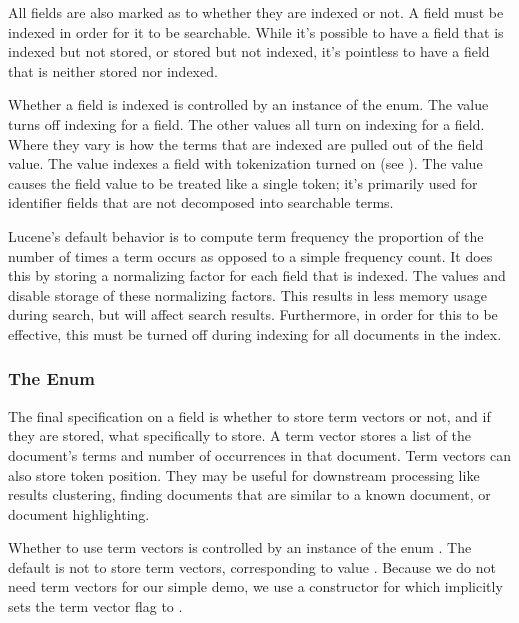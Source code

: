 All fields are also marked as to whether they are indexed or not.  A
field must be indexed in order for it to be searchable.  While it's
possible to have a field that is indexed but not stored, or stored but
not indexed, it's pointless to have a field that is neither stored nor
indexed.

Whether a field is indexed is controlled by an instance of the
 enum.  The value  turns off indexing
for a field.  The other values all turn on indexing for a field.
Where they vary is how the terms that are indexed are pulled out of
the field value.  The value  indexes a field with
tokenization turned on (see ).  The value
 causes the field value to be treated like a
single token; it's primarily used for identifier fields that are not
decomposed into searchable terms.

Lucene's default behavior is to compute term frequency the proportion
of the number of times a term occurs as opposed to a simple frequency
count.  It does this by storing a normalizing factor for each field
that is indexed.  The values  and
 disable storage of these
normalizing factors.  This results in less memory usage during
search, but will affect search results.  Furthermore, in order for this
to be effective,  this must be turned off during indexing for all
documents in the index.

\subsubsection{The  Enum}

The final specification on a field is whether to store term vectors or
not, and if they are stored, what specifically to store.  A term
vector stores a list of the document's terms and number of occurrences
in that document.  Term vectors can also store token position.  They
may be useful for downstream processing like results clustering, 
finding documents that are similar to a known document, or document
highlighting.

Whether to use term vectors is controlled by an instance of the enum
.  The default is not to store term vectors,
corresponding to value .  Because we do not need
term vectors for our simple demo, we use a
constructor for  which implicitly sets the term vector
flag to .

